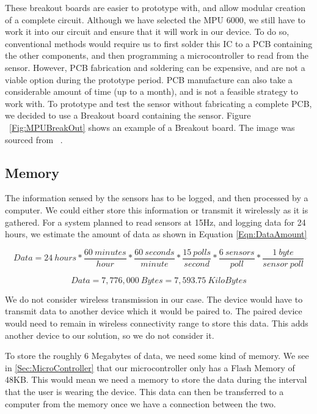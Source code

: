These breakout boards are easier to prototype with, and allow modular creation of a complete circuit. Although we have selected the MPU 6000, we still have to work it into our circuit and ensure that it will work in our device. To do so, conventional methods would require us to first solder this IC to a PCB containing the other components, and then programming a microcontroller to read from the sensor. However, PCB fabrication and soldering can be expensive, and are not a viable option during the prototype period. PCB manufacture can also take a considerable amount of time (up to a month), and is not a feasible strategy to work with. To prototype and test the sensor without fabricating a complete PCB, we decided to use a Breakout board containing the sensor. Figure ~\ref{Fig:MPUBreakOut} shows an example of a Breakout board. The image was sourced from ~\cite{Web:SFBreakout}.

\subsection{Memory}
\label{Sec:Memory}

The information sensed by the sensors has to be logged, and then processed by a computer. We could either store this information or transmit it wirelessly as it is gathered. For a system planned to read sensors at 15Hz, and logging data for 24 hours, we estimate the amount of data as shown in Equation \ref{Eqn:DataAmount}

\begin{equation}
\label{Eqn:DataAmount}
Data = 24~hours * \dfrac{60~minutes}{hour} * \dfrac{60~seconds}{minute} * \dfrac{15~polls}{second} * \dfrac{6~sensors}{poll} * \dfrac{1~byte}{sensor~poll}
\end{equation}

\begin{equation}
\label{Eqn:DataAmount2}
Data = 7,776,000~Bytes = 7,593.75~KiloBytes
\end{equation}

We do not consider wireless transmission in our case. The device would have to transmit data to another device which it would be paired to. The paired device would need to remain in wireless connectivity range to store this data. This adds another device to our solution, so we do not consider it. 

To store the roughly 6 Megabytes of data, we need some kind of memory. We see in \ref{Sec:MicroController} that our microcontroller only has a Flash Memory of 48KB. This would mean we need a memory to store the data during the interval that the user is wearing the device. This data can then be transferred to a computer from the memory once we have a connection between the two.

